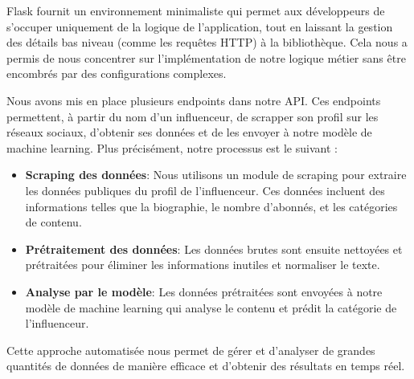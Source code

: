 \documentclass[12pt]{extarticle}
\begin{document}
Flask fournit un environnement minimaliste qui permet aux développeurs de s'occuper uniquement de la logique de l'application, tout en laissant la gestion des détails bas niveau (comme les requêtes HTTP) à la bibliothèque. Cela nous a permis de nous concentrer sur l'implémentation de notre logique métier sans être encombrés par des configurations complexes.

Nous avons mis en place plusieurs endpoints dans notre API. Ces endpoints permettent, à partir du nom d’un influenceur, de scrapper son profil sur les réseaux sociaux, d’obtenir ses données et de les envoyer à notre modèle de machine learning. Plus précisément, notre processus est le suivant :
\begin{itemize}
    \item \textbf{Scraping des données}: Nous utilisons un module de scraping pour extraire les données publiques du profil de l'influenceur. Ces données incluent des informations telles que la biographie, le nombre d'abonnés, et les catégories de contenu.
    \item \textbf{Prétraitement des données}: Les données brutes sont ensuite nettoyées et prétraitées pour éliminer les informations inutiles et normaliser le texte.
    \item \textbf{Analyse par le modèle}: Les données prétraitées sont envoyées à notre modèle de machine learning qui analyse le contenu et prédit la catégorie de l’influenceur.
\end{itemize}
Cette approche automatisée nous permet de gérer et d'analyser de grandes quantités de données de manière efficace et d'obtenir des résultats en temps réel.
\clearpage
\end{document}
